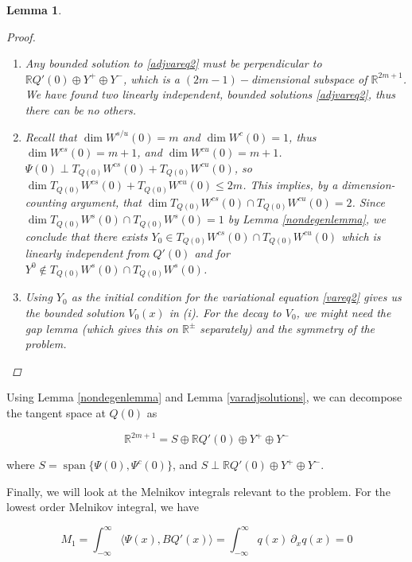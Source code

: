 \documentclass[12pt]{article}
\def\R{{\mathbb R}}
\DeclareMathOperator{\spn}{span}
\newtheorem{lemma}{Lemma}
\begin{document}
\begin{lemma}
\begin{proof}
\begin{enumerate}
where the functions $g_j(x)$ are linear combinations of the functions $f_j(x)$ from \eqref{DefA} and their derivatives and are thus exponentially localized. Thus we see that $\Psi^c(x) \rightarrow W_0$ as $|x| \rightarrow \infty$, where $W_0$ is given by \eqref{W0}.

\item Any bounded solution to \eqref{adjvareq2} must be perpendicular to $\R Q'(0) \oplus Y^+ \oplus Y^-$, which is a $(2m-1)-$dimensional subspace of $\R^{2m+1}$. We have found two linearly independent, bounded solutions \eqref{adjvareq2}, thus there can be no others.

\item Recall that $\dim W^{s/u}(0) = m$ and $\dim W^c(0) = 1$, thus $\dim W^{cs}(0) = m + 1$, and $\dim W^{cu}(0) = m + 1$. $\Psi(0) \perp T_{Q(0)}W^{cs}(0) + T_{Q(0)}W^{cu}(0)$, so $\dim T_{Q(0)}W^{cs}(0) + T_{Q(0)}W^{cu}(0) \leq 2m$. This implies, by a dimension-counting argument, that $\dim T_{Q(0)}W^{cs}(0) \cap T_{Q(0)}W^{cu}(0) = 2$. Since $\dim T_{Q(0)}W^s(0) \cap T_{Q(0)}W^s(0) = 1$ by Lemma \ref{nondegenlemma}, we conclude that there exists $Y_0 \in T_{Q(0)}W^{cs}(0) \cap T_{Q(0)}W^{cu}(0)$ which is linearly independent from $Q'(0)$ and for $Y^0 \notin T_{Q(0)}W^s(0) \cap T_{Q(0)}W^s(0)$.

\item Using $Y_0$ as the initial condition for the variational equation \eqref{vareq2} gives us the bounded solution $V_0(x)$ in (i). For the decay to $V_0$, we might need the gap lemma (which gives this on $\R^\pm$ separately) and the symmetry of the problem.

\end{enumerate}
\end{proof}
\end{lemma}

Using Lemma \ref{nondegenlemma} and Lemma \ref{varadjsolutions}, we can decompose the tangent space at $Q(0)$ as 

\begin{equation}
\R^{2m+1} = S \oplus \R Q'(0) \oplus Y^+ \oplus Y^-
\end{equation}

where $S = \spn\{ \Psi(0), \Psi^c(0) \}$, and $S \perp \R Q'(0) \oplus Y^+ \oplus Y^-$.

Finally, we will look at the Melnikov integrals relevant to the problem. For the lowest order Melnikov integral, we have

\begin{equation}\label{M1}
M_1 = \int_{-\infty}^\infty \langle \Psi(x), B Q'(x) \rangle =
\int_{-\infty}^\infty q(x) \: \partial_x q(x) = 0
\end{equation}
\end{document}

